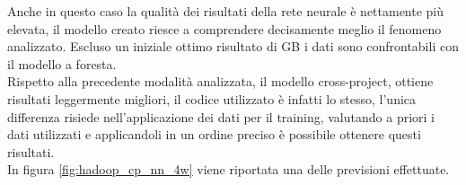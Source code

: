 \documentclass[%
    corpo=12pt,
    twoside,
    oldstyle,
    autoretitolo,
    greek,
    evenboxes,
]{toptesi}
\begin{document}
\begin{center}
   \label{tab:cross_project_hadoop}
\end{center}
Anche in questo caso la qualità dei risultati della rete neurale è nettamente più elevata, il modello creato riesce a comprendere decisamente meglio il fenomeno analizzato. Escluso un iniziale ottimo risultato di GB i dati sono confrontabili con il modello a foresta.\\
Rispetto alla precedente modalità analizzata, il modello cross-project, ottiene risultati leggermente migliori, il codice utilizzato è infatti lo stesso, l'unica differenza risiede nell'applicazione dei dati per il training, valutando a priori i dati utilizzati e applicandoli in un ordine preciso è possibile ottenere questi risultati.\\
In figura \ref{fig:hadoop_cp_nn_4w} viene riportata una delle previsioni effettuate.
\end{document}
